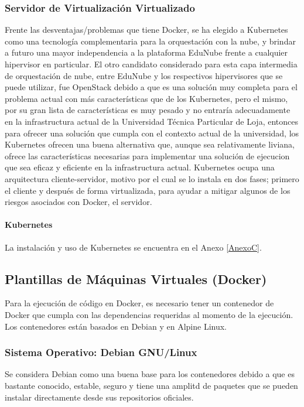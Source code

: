 \subsubsection{Servidor de Virtualización Virtualizado}
Frente las desventajas/problemas que tiene Docker, se ha elegido a Kubernetes como una tecnología complementaria para la orquestación con la nube, y brindar a futuro una mayor independencia a la plataforma EduNube frente a cualquier hipervisor en particular. El otro candidato considerado para esta capa intermedia de orquestación de nube, entre EduNube y los respectivos hipervisores que se puede utilizar, fue OpenStack debido a que es una solución muy completa para el problema actual con más características que de los Kubernetes, pero el mismo, por su gran lista de características es muy pesado y no entraría adecuadamente en la infrastructura actual de la Universidad Técnica Particular de Loja, entonces para ofrecer una solución que cumpla con el contexto actual de la universidad, los Kubernetes ofrecen una buena alternativa que, aunque sea relativamente liviana, ofrece las características necesarias para implementar una solución de ejecucion que sea eficaz y eficiente en la infrastructura actual. Kubernetes ocupa una arquitectura cliente-servidor, motivo por el cual se lo instala en dos fases; primero el cliente y después de forma virtualizada, para ayudar a mitigar algunos de los riesgos asociados con Docker, el servidor. 

\paragraph{Kubernetes}
La instalación y uso de Kubernetes se encuentra en el Anexo \ref{AnexoC}.

\subsection{Plantillas de Máquinas Virtuales (Docker)}
Para la ejecución de código en Docker, es necesario tener un contenedor de Docker que cumpla con las dependencias requeridas al momento de la ejecución. Los contenedores están basados en Debian y en Alpine Linux.

\subsubsection{Sistema Operativo: Debian GNU/Linux}
Se considera Debian como una buena base para los contenedores debido a que es bastante conocido, estable, seguro y tiene una amplitd de paquetes que se pueden instalar directamente desde sus repositorios oficiales.

